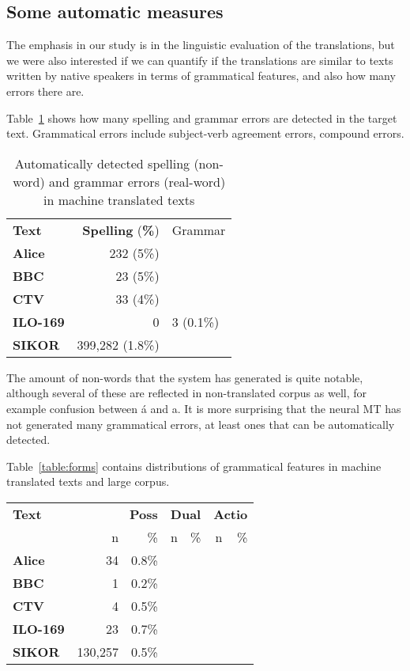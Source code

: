 \documentclass{flammie}
\begin{document}
\subsection{Some automatic measures}

The emphasis in our study is in the linguistic evaluation of the translations,
but we were also interested if we can quantify if the translations are similar
to texts written by native speakers in terms of grammatical features, and also
how many errors there are.

Table~\ref{table:errors} shows how many spelling and grammar errors are detected
in the target text.  Grammatical errors include subject-verb agreement errors,
compound errors.

\begin{table}
\small
\centering
\begin{tabular}{lrl}
\toprule
    \textbf{Text} & \textbf{Spelling} (\textbf{\%}) & Grammar \\
    \bf Alice & 232 (5\%) & \\
    \bf BBC &  23 (5\%) & \\
    \bf CTV &  33 (4\%) & \\
    \bf ILO-169 & 0 & 3 (0.1\%) \\
\midrule
    \bf SIKOR & 399,282 (1.8\%) & \\
\bottomrule
\end{tabular}
\caption{\label{table:errors} Automatically detected spelling (non-word) and
    grammar errors (real-word) in machine translated texts }
\end{table}

The amount of non-words that the system has generated is quite notable, although
several of these are reflected in non-translated corpus as well, for example
confusion between á and a.  It is more surprising that the neural MT has not
generated many grammatical errors, at least ones that can be automatically
detected.

Table~\ref{table:forms} contains distributions of grammatical features in
machine translated texts and large corpus.


\begin{table*}
\centering
\begin{tabular}{lrrrrrr}
\toprule
\textbf{Text} & \multicolumn{2}{r}{\textbf{Poss}} & \multicolumn{2}{r}{\bf Dual} & \multicolumn{2}{r}{\bf Actio}   \\
& n & \% & n & \%& n & \%\\
\midrule
\bf Alice & 34 & 0.8\% \\
\bf BBC &  1 & 0.2\% \\
\bf CTV &  4 & 0.5\% \\
\bf ILO-169 & 23 & 0.7\% \\
\midrule
\bf SIKOR & 130,257 & 0.5\% \\
\bottomrule
\end{tabular}
\caption{\label{table:forms} Distribution of grammatical features in machine
    translated documents (first four) and the large corpus (SIKOR).}
\end{table*}
\end{document}
